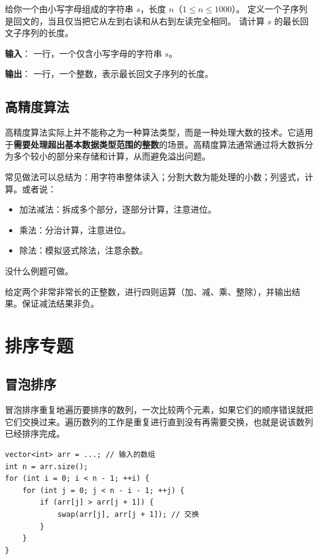 \documentclass{article}
\begin{document}
\begin{problem}
  给你一个由小写字母组成的字符串 $s$，长度 $n$（$1\le n\le 1000$）。
  定义一个子序列是回文的，当且仅当把它从左到右读和从右到左读完全相同。
  请计算 $s$ 的最长回文子序列的长度。

  \textbf{输入}：
  一行，一个仅含小写字母的字符串 $s$。

  \textbf{输出}：
  一行，一个整数，表示最长回文子序列的长度。
\end{problem}

\subsection{高精度算法}

高精度算法实际上并不能称之为一种算法类型，而是一种处理大数的技术。它适用于\textbf{需要处理超出基本数据类型范围的整数}的场景。高精度算法通常通过将大数拆分为多个较小的部分来存储和计算，从而避免溢出问题。

常见做法可以总结为：用字符串整体读入；分割大数为能处理的小数；列竖式，计算。或者说：

\begin{itemize}
  \item 加法减法：拆成多个部分，逐部分计算，注意进位。
  \item 乘法：分治计算，注意进位。
  \item 除法：模拟竖式除法，注意余数。
\end{itemize}

没什么例题可做。
\begin{problem}
  给定两个非常非常长的正整数，进行四则运算（加、减、乘、整除），并输出结果。保证减法结果非负。
\end{problem}

\section{排序专题}

\subsection{冒泡排序}

冒泡排序重复地遍历要排序的数列，一次比较两个元素，如果它们的顺序错误就把它们交换过来。遍历数列的工作是重复进行直到没有再需要交换，也就是说该数列已经排序完成。

\begin{lstlisting}
vector<int> arr = ...; // 输入的数组
int n = arr.size();
for (int i = 0; i < n - 1; ++i) {
    for (int j = 0; j < n - i - 1; ++j) {
        if (arr[j] > arr[j + 1]) {
            swap(arr[j], arr[j + 1]); // 交换
        }
    }
}
\end{lstlisting}
\end{document}
